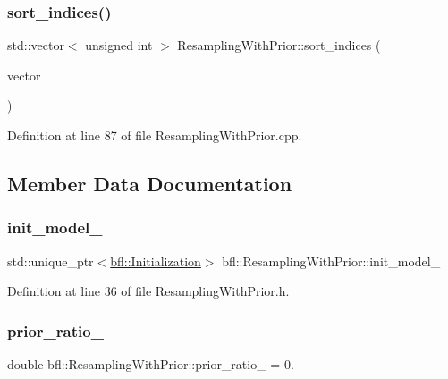 \subsubsection{\texorpdfstring{sort\+\_\+indices()}{sort\_indices()}}
{\footnotesize\ttfamily std\+::vector$<$ unsigned int $>$ Resampling\+With\+Prior\+::sort\+\_\+indices (\begin{DoxyParamCaption}\item[{const Eigen\+::\+Ref$<$ const Eigen\+::\+Vector\+Xf $>$ \&}]{vector }\end{DoxyParamCaption})\hspace{0.3cm}{\ttfamily [private]}}



Definition at line 87 of file Resampling\+With\+Prior.\+cpp.



\subsection{Member Data Documentation}
\mbox{\label{classbfl_1_1ResamplingWithPrior_ae5902ab0af10d76ddb9c12a15db42947}} 
\subsubsection{\texorpdfstring{init\+\_\+model\+\_\+}{init\_model\_}}
{\footnotesize\ttfamily std\+::unique\+\_\+ptr$<$\mbox{\hyperlink{classbfl_1_1Initialization}{bfl\+::\+Initialization}}$>$ bfl\+::\+Resampling\+With\+Prior\+::init\+\_\+model\+\_\+\hspace{0.3cm}{\ttfamily [protected]}}



Definition at line 36 of file Resampling\+With\+Prior.\+h.

\mbox{\label{classbfl_1_1ResamplingWithPrior_a5f2d0d6f948348428a992232de091c66}} 
\subsubsection{\texorpdfstring{prior\+\_\+ratio\+\_\+}{prior\_ratio\_}}
{\footnotesize\ttfamily double bfl\+::\+Resampling\+With\+Prior\+::prior\+\_\+ratio\+\_\+ = 0.\hspace{0.3cm}{\ttfamily [protected]}}



